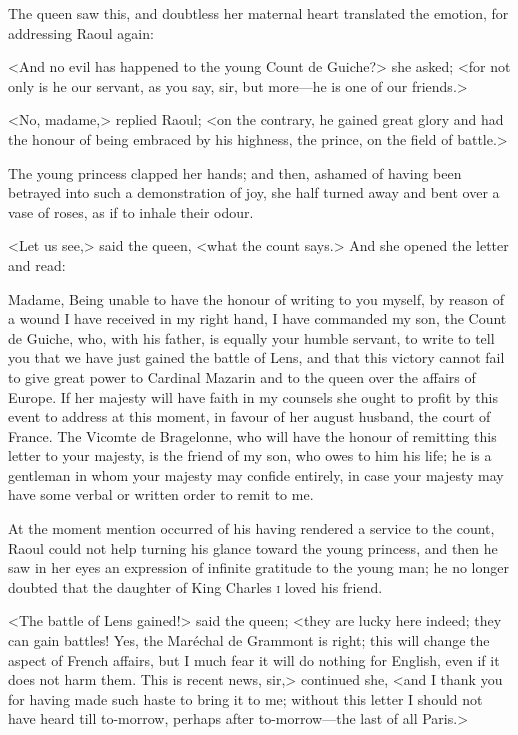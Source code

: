 The queen saw this, and doubtless her maternal heart translated the emotion, for addressing Raoul again:

<And no evil has happened to the young Count de Guiche?> she asked; <for not only is he our servant, as you say, sir, but more—he is one of our friends.>

<No, madame,> replied Raoul; <on the contrary, he gained great glory and had the honour of being embraced by his highness, the prince, on the field of battle.>

The young princess clapped her hands; and then, ashamed of having been betrayed into such a demonstration of joy, she half turned away and bent over a vase of roses, as if to inhale their odour.

<Let us see,> said the queen, <what the count says.> And she opened the letter and read: 

\begin{mail}{}{Madame,}
Being unable to have the honour of writing to you myself, by reason of a wound I have received in my right hand, I have commanded my son, the Count de Guiche, who, with his father, is equally your humble servant, to write to tell you that we have just gained the battle of Lens, and that this victory cannot fail to give great power to Cardinal Mazarin and to the queen over the affairs of Europe. If her majesty will have faith in my counsels she ought to profit by this event to address at this moment, in favour of her august husband, the court of France. The Vicomte de Bragelonne, who will have the honour of remitting this letter to your majesty, is the friend of my son, who owes to him his life; he is a gentleman in whom your majesty may confide entirely, in case your majesty may have some verbal or written order to remit to me. 
\end{mail}

At the moment mention occurred of his having rendered a service to the count, Raoul could not help turning his glance toward the young princess, and then he saw in her eyes an expression of infinite gratitude to the young man; he no longer doubted that the daughter of King Charles \textsc{i}  loved his friend.

<The battle of Lens gained!> said the queen; <they are lucky here indeed; they can gain battles! Yes, the Maréchal de Grammont is right; this will change the aspect of French affairs, but I much fear it will do nothing for English, even if it does not harm them. This is recent news, sir,> continued she, <and I thank you for having made such haste to bring it to me; without this letter I should not have heard till to-morrow, perhaps after to-morrow—the last of all Paris.>

